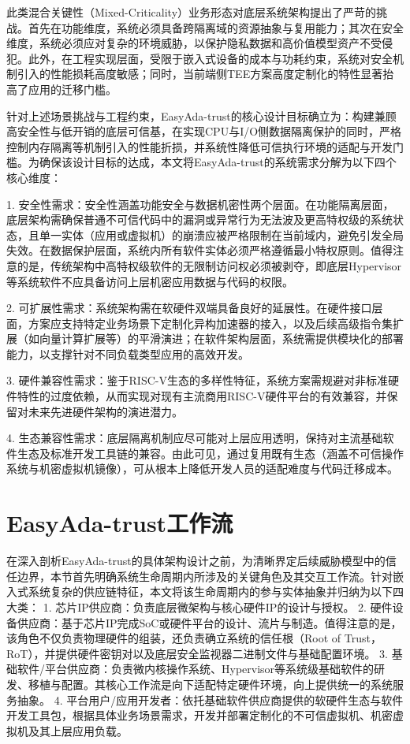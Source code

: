 \documentclass[master, vlined, review]{DissertUESTC}
\begin{document}
	此类混合关键性（Mixed-Criticality）业务形态对底层系统架构提出了严苛的挑战。首先在功能维度，系统必须具备跨隔离域的资源抽象与复用能力；其次在安全维度，系统必须应对复杂的环境威胁，以保护隐私数据和高价值模型资产不受侵犯。此外，在工程实现层面，受限于嵌入式设备的成本与功耗约束，系统对安全机制引入的性能损耗高度敏感；同时，当前端侧TEE方案高度定制化的特性显著抬高了应用的迁移门槛。
	
	针对上述场景挑战与工程约束，EasyAda-trust的核心设计目标确立为：构建兼顾高安全性与低开销的底层可信基，在实现CPU与I/O侧数据隔离保护的同时，严格控制内存隔离等机制引入的性能折损，并系统性降低可信执行环境的适配与开发门槛。为确保该设计目标的达成，本文将EasyAda-trust的系统需求分解为以下四个核心维度：
	
	1. 安全性需求：安全性涵盖功能安全与数据机密性两个层面。在功能隔离层面，底层架构需确保普通不可信代码中的漏洞或异常行为无法波及更高特权级的系统状态，且单一实体（应用或虚拟机）的崩溃应被严格限制在当前域内，避免引发全局失效。在数据保护层面，系统内所有软件实体必须严格遵循最小特权原则。值得注意的是，传统架构中高特权级软件的无限制访问权必须被剥夺，即底层Hypervisor等系统软件不应具备访问上层机密应用数据与代码的权限。
	
	2. 可扩展性需求：系统架构需在软硬件双端具备良好的延展性。在硬件接口层面，方案应支持特定业务场景下定制化异构加速器的接入，以及后续高级指令集扩展（如向量计算扩展等）的平滑演进；在软件架构层面，系统需提供模块化的部署能力，以支撑针对不同负载类型应用的高效开发。
	
	3. 硬件兼容性需求：鉴于RISC-V生态的多样性特征，系统方案需规避对非标准硬件特性的过度依赖，从而实现对现有主流商用RISC-V硬件平台的有效兼容，并保留对未来先进硬件架构的演进潜力。
	
	4. 生态兼容性需求：底层隔离机制应尽可能对上层应用透明，保持对主流基础软件生态及标准开发工具链的兼容。由此可见，通过复用既有生态（涵盖不可信操作系统与机密虚拟机镜像），可从根本上降低开发人员的适配难度与代码迁移成本。
	
	\section{EasyAda-trust工作流}
	在深入剖析EasyAda-trust的具体架构设计之前，为清晰界定后续威胁模型中的信任边界，本节首先明确系统生命周期内所涉及的关键角色及其交互工作流。针对嵌入式系统复杂的供应链特征，本文将该生命周期内的参与实体抽象并归纳为以下四大类：
	1. 芯片IP供应商：负责底层微架构与核心硬件IP的设计与授权。
	2. 硬件设备供应商：基于芯片IP完成SoC或硬件平台的设计、流片与制造。值得注意的是，该角色不仅负责物理硬件的组装，还负责确立系统的信任根（Root of Trust，RoT），并提供硬件密钥对以及底层安全监视器二进制文件与基础配置环境。
	3. 基础软件/平台供应商：负责微内核操作系统、Hypervisor等系统级基础软件的研发、移植与配置。其核心工作流是向下适配特定硬件环境，向上提供统一的系统服务抽象。
	4. 平台用户/应用开发者：依托基础软件供应商提供的软硬件生态与软件开发工具包，根据具体业务场景需求，开发并部署定制化的不可信虚拟机、机密虚拟机及其上层应用负载。
\end{document}
